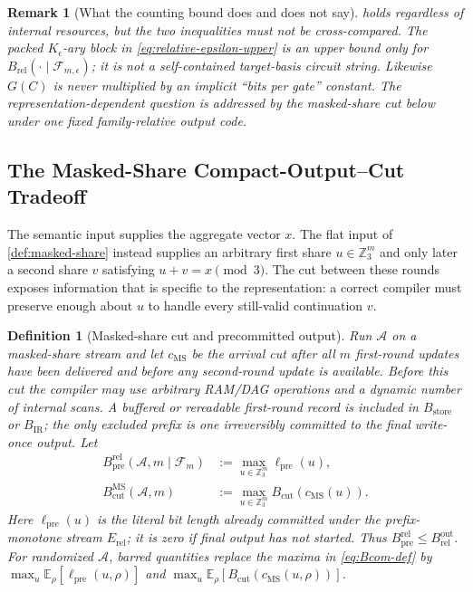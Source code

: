 \documentclass[a4paper,twocolumn,10pt,unpublished]{quantumarticle}
\newtheorem{definition}{Definition}
\newtheorem{remark}{Remark}
\begin{document}
\begin{remark}[What the counting bound does and does not say]
\label{rem:pass-through}
 holds regardless of internal resources, but the
two inequalities must not be cross-compared.  The packed $K_\epsilon$-ary
block in \eqref{eq:relative-epsilon-upper} is an upper bound only for
$B_{\mathrm{rel}}(\cdot\mid\mathcal F_{m,\epsilon})$; it is not a
self-contained target-basis circuit string.  Likewise $G(C)$ is never
multiplied by an implicit ``bits per gate'' constant.  The
representation-dependent question is addressed by the masked-share cut
below under one fixed family-relative output code.
\end{remark}

\subsection{The Masked-Share Compact-Output--Cut Tradeoff}

The semantic input supplies the aggregate vector $x$.  The flat input of
\cref{def:masked-share} instead supplies an arbitrary first share
$u\in\mathbb Z_3^m$ and only later a second share $v$ satisfying
$u+v=x\pmod 3$.  The cut between these rounds exposes information that is
specific to the representation: a correct compiler must preserve enough
about $u$ to handle every still-valid continuation $v$.

\begin{definition}[Masked-share cut and precommitted output]
\label{def:cuts}
Run $\mathcal A$ on a masked-share stream and let $c_{\mathrm{MS}}$ be the
arrival cut after all $m$ first-round updates have been delivered and before
any second-round update is available.  Before this cut the compiler may use
arbitrary RAM/DAG operations and a dynamic number of internal scans.  A
buffered or rereadable first-round record is included in
$B_{\mathrm{store}}$ or $B_{\mathrm{IR}}$; the only excluded prefix is one
irreversibly committed to the final write-once output.  Let
\begin{equation}\label{eq:Bcom-def}
\begin{aligned}
 B_{\mathrm{pre}}^{\mathrm{rel}}(\mathcal A,m\mid\mathcal F_m)
 &:=\max_{u\in\mathbb Z_3^m}
 \ell_{\mathrm{pre}}(u),\\
 B_{\mathrm{cut}}^{\mathrm{MS}}(\mathcal A,m)
 &:=\max_{u\in\mathbb Z_3^m}B_{\mathrm{cut}}(c_{\mathrm{MS}}(u)).
\end{aligned}
\end{equation}
Here $\ell_{\mathrm{pre}}(u)$ is the literal bit length already committed
under the prefix-monotone stream $E_{\mathrm{rel}}$; it is zero if final
output has not started.  Thus
$B_{\mathrm{pre}}^{\mathrm{rel}}\leq
B_{\mathrm{rel}}^{\mathrm{out}}$.
For randomized $\mathcal A$, barred quantities replace the maxima in
\eqref{eq:Bcom-def} by
$\max_u\mathbb E_\rho[\ell_{\mathrm{pre}}(u,\rho)]$ and
$\max_u\mathbb E_\rho[B_{\mathrm{cut}}(c_{\mathrm{MS}}(u,\rho))]$.
\end{definition}
\end{document}
